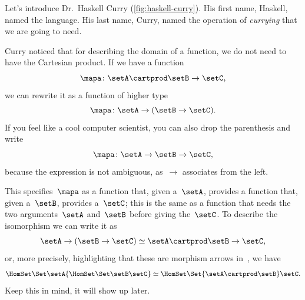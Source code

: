 Let's introduce Dr.~Haskell Curry (\cref{fig:haskell-curry}).
His first name,  Haskell, named the language.
His last name, Curry, named the operation of \emph{currying} that we are going to need.

Curry noticed that for describing the domain of a function, we do not need to have the Cartesian product.
If we have a function
\begin{equation}
    \label{eq:currying-1}
    \mapa \colon \setA \cartprod \setB \to \setC,
\end{equation}
we can rewrite it as a function of higher type
\begin{equation}
    \label{eq:currying-2}
    \mapa \colon \setA \to ( \setB \to \setC).
\end{equation}
If you feel like a cool computer scientist, you can also drop the parenthesis and write
\begin{equation}
    \label{eq:currying-3}
    \mapa \colon \setA \to \setB \to \setC,
\end{equation}
because the expression is not ambiguous, as~$\to$ associates from the left.


This specifies~$\mapa$ as a function that, given a~$\setA$, provides a function that, given a~$\setB$, provides a~$\setC$;
this is the same as a function that needs the two arguments~$\setA$ and~$\setB$ before giving the~$\setC$.
To describe the isomorphism we can write it as
\begin{equation}
    \label{eq:currying-iso-1}
    \setA \to ( \setB \to \setC) \simeq  \setA \cartprod \setB \to \setC,
\end{equation}
or, more precisely, highlighting that these are morphism arrows in~\Set, we have
\begin{equation}
    \label{eq:currying-iso-2}
    \HomSet\Set\setA{\HomSet\Set\setB\setC} \simeq \HomSet\Set{\setA \cartprod \setB}\setC.
\end{equation}
Keep this in mind, it will show up later.

